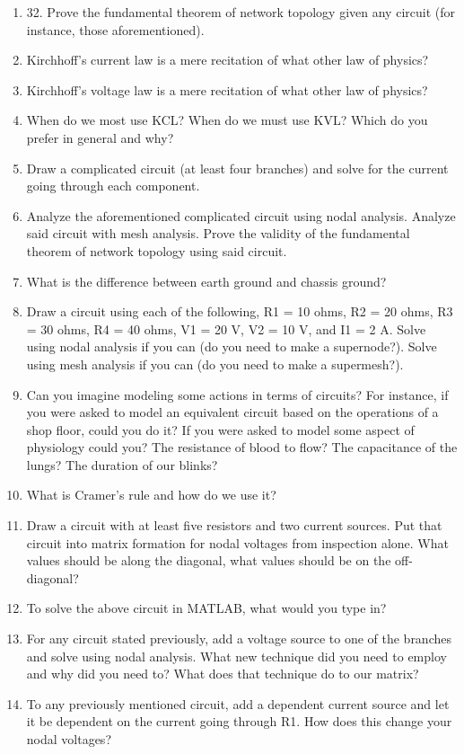 \documentclass[11pt]{book}
\begin{document}
\begin{enumerate}
	\item 32.	Prove the fundamental theorem of network topology given any circuit (for instance, those aforementioned).
	\item Kirchhoff’s current law is a mere recitation of what other law of physics?
	\item Kirchhoff’s voltage law is a mere recitation of what other law of physics?
	\item When do we most use KCL? When do we must use KVL? Which do you prefer in general and why?
	\item Draw a complicated circuit (at least four branches) and solve for the current going through each component.
	\item Analyze the aforementioned complicated circuit using nodal analysis. Analyze said circuit with mesh analysis. Prove the validity of the fundamental theorem of network topology using said circuit.
	\item What is the difference between earth ground and chassis ground?
	\item Draw a circuit using each of the following, R1 = 10 ohms, R2 = 20 ohms, R3 = 30 ohms, R4 = 40 ohms, V1 = 20 V, V2 = 10 V, and I1 = 2 A. Solve using nodal analysis if you can (do you need to make a supernode?). Solve using mesh analysis if you can (do you need to make a supermesh?).
	\item Can you imagine modeling some actions in terms of circuits? For instance, if you were asked to model an equivalent circuit based on the operations of a shop floor, could you do it? If you were asked to model some aspect of physiology could you? The resistance of blood to flow? The capacitance of the lungs? The duration of our blinks?
	\item What is Cramer’s rule and how do we use it?
	\item Draw a circuit with at least five resistors and two current sources. Put that circuit into matrix formation for nodal voltages from inspection alone. What values should be along the diagonal, what values should be on the off-diagonal?
	\item To solve the above circuit in MATLAB, what would you type in?
	\item For any circuit stated previously, add a voltage source to one of the branches and solve using nodal analysis. What new technique did you need to employ and why did you need to? What does that technique do to our matrix?
	\item To any previously mentioned circuit, add a dependent current source and let it be dependent on the current going through R1. How does this change your nodal voltages?

\end{enumerate}
\end{document}
